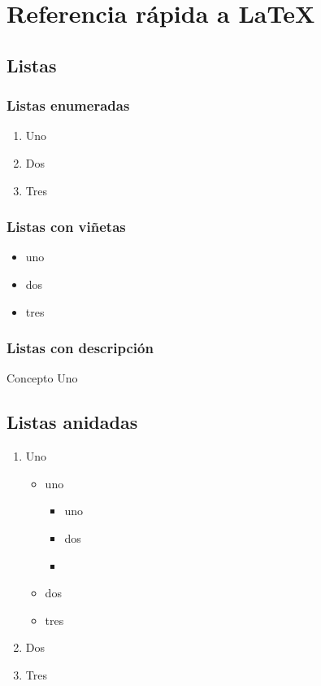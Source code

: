 
\chapter{Referencia rápida a LaTeX}

\section{Listas}

\subsection{Listas enumeradas}

\begin{enumerate}
\item Uno
\item Dos
\item Tres
\end{enumerate}

\subsection{Listas con viñetas}

\begin{itemize}
\item uno 
\item dos
\item tres
\end{itemize}


\subsection{Listas con descripción}

\begin{description}
\item[Concepto Uno] \lipsum[5] 
\end{description}


\section{Listas anidadas}

\begin{enumerate}
\item Uno
	\begin{itemize}
	\item uno 
		\begin{itemize}
		\item uno 
		\item dos
		\item \lipsum[5] \\
		\end{itemize}
	\item dos
	\item tres
	\end{itemize}
\item Dos
\item Tres
\end{enumerate}











